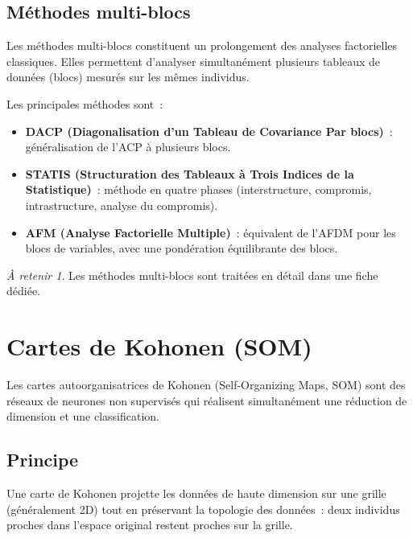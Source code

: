 \documentclass[a4paper,11pt]{article}
\theoremstyle{definition}
\theoremstyle{remark}
\newtheorem*{important}{\`A retenir}
\begin{document}
\subsection{M\'ethodes multi-blocs}

Les m\'ethodes multi-blocs constituent un prolongement des analyses
factorielles classiques. Elles permettent d'analyser simultan\'ement
plusieurs tableaux de donn\'ees (blocs) mesur\'es sur les m\^emes
individus.

Les principales m\'ethodes sont~:
\begin{itemize}
  \item \textbf{DACP (Diagonalisation d'un Tableau de Covariance
    Par blocs)}~: g\'en\'eralisation de l'ACP \`a plusieurs blocs.
  \item \textbf{STATIS (Structuration des Tableaux \`a Trois Indices
    de la Statistique)}~: m\'ethode en quatre phases (interstructure,
    compromis, intrastructure, analyse du compromis).
  \item \textbf{AFM (Analyse Factorielle Multiple)}~: \'equivalent
    de l'AFDM pour les blocs de variables, avec une pond\'eration
    \'equilibrante des blocs.
\end{itemize}

\begin{important}
  Les m\'ethodes multi-blocs sont traitées en d\'etail dans une
  fiche d\'edi\'ee.
\end{important}

\section{Cartes de Kohonen (SOM)}

Les cartes autoorganisatrices de Kohonen (Self-Organizing Maps, SOM)
sont des r\'eseaux de neurones non supervis\'es qui r\'ealisent
simultan\'ement une r\'eduction de dimension et une classification.

\subsection{Principe}

Une carte de Kohonen projette les donn\'ees de haute dimension sur
une grille (g\'en\'eralement 2D) tout en pr\'eservant la topologie
des donn\'ees~: deux individus proches dans l'espace original
restent proches sur la grille.
\end{document}
